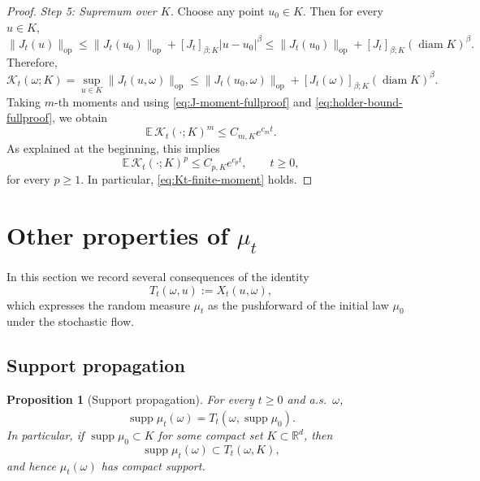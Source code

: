\documentclass{tsp-short}
\newtheorem{proposition}{Proposition}[section]
\theoremstyle{remark}
\theoremstyle{definition}
\begin{document}
\begin{proof}
\smallskip
\noindent\emph{Step 5: Supremum over \(K\).}
Choose any point \(u_0\in K\).
Then for every \(u\in K\),
\[
\|J_t(u)\|_{\mathrm{op}}
\le
\|J_t(u_0)\|_{\mathrm{op}}
+
[J_t]_{\beta;K}|u-u_0|^\beta
\le
\|J_t(u_0)\|_{\mathrm{op}}
+
[J_t]_{\beta;K}(\operatorname{diam}K)^\beta.
\]
Therefore,
\[
\mathcal{K}_t(\omega;K)
=
\sup_{u\in K}\|J_t(u,\omega)\|_{\mathrm{op}}
\le
\|J_t(u_0,\omega)\|_{\mathrm{op}}
+
[J_t(\omega)]_{\beta;K}(\operatorname{diam}K)^\beta.
\]
Taking \(m\)-th moments and using \eqref{eq:J-moment-fullproof} and \eqref{eq:holder-bound-fullproof}, we obtain
\[
\mathbb{E}\,\mathcal{K}_t(\cdot;K)^m
\le
C_{m,K}e^{c_m t}.
\]
As explained at the beginning, this implies
\[
\mathbb{E}\,\mathcal{K}_t(\cdot;K)^p
\le
C_{p,K}e^{c_p t},
\qquad t\ge0,
\]
for every \(p\ge1\).
In particular, \eqref{eq:Kt-finite-moment} holds.
\end{proof}







\section{Other properties of $\mu_t$}

In this section we record several consequences of the identity
\begin{equation*}
T_t(\omega,u):=X_t(u,\omega),
\end{equation*}
which expresses the random measure $\mu_t$ as the pushforward of the initial law $\mu_0$ under the stochastic flow.

\subsection{Support propagation}

\begin{proposition}[Support propagation]\label{prop:support-propagation}
For every $t\ge 0$ and a.s.\ $\omega$,
\begin{equation*}
\operatorname{supp}\mu_t(\omega)
=
\overline{T_t(\omega,\operatorname{supp}\mu_0)}.
\end{equation*}
In particular, if $\operatorname{supp}\mu_0\subset K$ for some compact set $K\subset\mathbb{R}^d$, then
\begin{equation*}
\operatorname{supp}\mu_t(\omega)\subset T_t(\omega,K),
\end{equation*}
and hence $\mu_t(\omega)$ has compact support.
\end{proposition}
\end{document}
